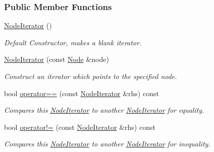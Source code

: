 \subsubsection*{Public Member Functions}
\begin{DoxyCompactItemize}
\item 
\hypertarget{classphys_1_1xml_1_1NodeIterator_af4558d54684f8ff49b88396f2d0fecd6}{
\hyperlink{classphys_1_1xml_1_1NodeIterator_af4558d54684f8ff49b88396f2d0fecd6}{NodeIterator} ()}
\label{classphys_1_1xml_1_1NodeIterator_af4558d54684f8ff49b88396f2d0fecd6}

\begin{DoxyCompactList}\small\item\em Default Constructor, makes a blank iterator. \item\end{DoxyCompactList}\item 
\hyperlink{classphys_1_1xml_1_1NodeIterator_abb8a4e6882e921fa57e309c28a5f7fe9}{NodeIterator} (const \hyperlink{classphys_1_1xml_1_1Node}{Node} \&node)
\begin{DoxyCompactList}\small\item\em Construct an iterator which points to the specified node. \item\end{DoxyCompactList}\item 
bool \hyperlink{classphys_1_1xml_1_1NodeIterator_a5c8ad72fbdbf0ae621fb041fef422a5e}{operator==} (const \hyperlink{classphys_1_1xml_1_1NodeIterator}{NodeIterator} \&rhs) const 
\begin{DoxyCompactList}\small\item\em Compares this \hyperlink{classphys_1_1xml_1_1NodeIterator}{NodeIterator} to another \hyperlink{classphys_1_1xml_1_1NodeIterator}{NodeIterator} for equality. \item\end{DoxyCompactList}\item 
bool \hyperlink{classphys_1_1xml_1_1NodeIterator_a357923a57edc54937743fb865be7c3b3}{operator!=} (const \hyperlink{classphys_1_1xml_1_1NodeIterator}{NodeIterator} \&rhs) const 
\begin{DoxyCompactList}\small\item\em Compares this \hyperlink{classphys_1_1xml_1_1NodeIterator}{NodeIterator} to another \hyperlink{classphys_1_1xml_1_1NodeIterator}{NodeIterator} for inequality. \item\end{DoxyCompactList}\item 

\end{DoxyCompactItemize}

